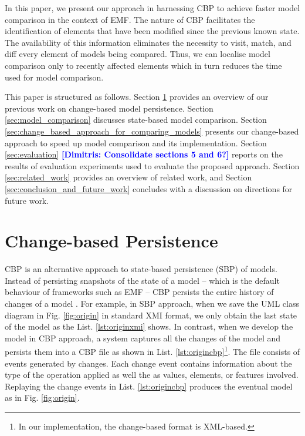 \documentclass{jot}
\newcommand{\dk}[1]{\textcolor{blue}{\textbf{[Dimitris: #1]}}}
\begin{document}
In this paper, we present our approach in harnessing CBP to achieve faster model comparison in the context of EMF. The nature of CBP facilitates the identification of elements that have been modified since the previous known state. The availability of this information eliminates the necessity to visit, match, and diff every element of models being compared. Thus, we can localise model comparison only to recently affected elements which in turn reduces the time used for model comparison.

This paper is structured as follows. Section \ref{sec:change-based_persistence} provides an overview of our previous work on change-based model persistence. Section \ref{sec:model_comparison} discusses state-based model comparison. Section \ref{sec:change_based_approach_for_comparing_models} presents our change-based approach to speed up model comparison and its implementation. Section \ref{sec:evaluation} \dk{Consolidate sections 5 and 6?} reports on the results of evaluation experiments used to evaluate the proposed approach. Section \ref{sec:related_work} provides an overview of related work, and Section \ref{sec:conclusion_and_future_work} concludes with a discussion on directions for future work.

\vspace{-10pt}
\section{Change-based Persistence}
\label{sec:change-based_persistence}

\vspace{-5pt}
CBP is an alternative approach to state-based persistence (SBP) of models. Instead of persisting snapshots of the state of a model -- which is the default behaviour of frameworks such as EMF -- CBP persists the entire history of changes of a model \cite{yohannis2018towards}. For example, in SBP approach, when we save the UML class diagram in Fig. \ref{fig:origin} in standard XMI format, we only obtain the last state of the model as the List. \ref{lst:originxmi} shows. In contrast, when we develop the model in CBP approach, a system captures all the changes of the model and persists them into a CBP file as shown in List. \ref{lst:origincbp}\footnote{In our implementation, the change-based format is XML-based.}. The file consists of events generated by changes. Each change event contains information about the type of the operation applied as well the as values, elements, or features involved. Replaying the change events in List. \ref{lst:origincbp} produces the eventual model as in Fig. \ref{fig:origin}.
\end{document}
